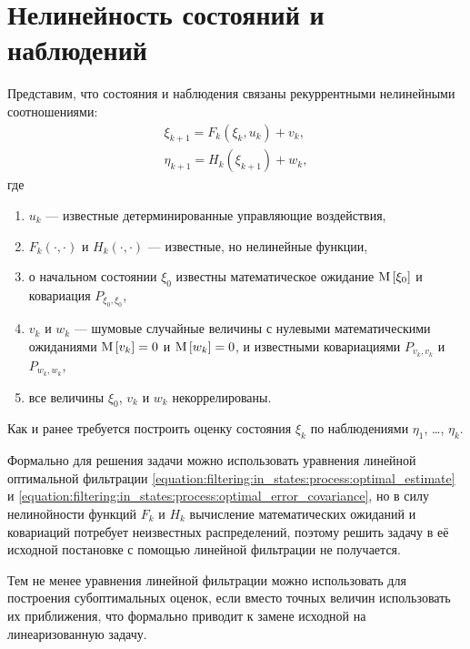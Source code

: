 \section{Нелинейность состояний и наблюдений}

Представим, что состояния и наблюдения связаны рекуррентными нелинейными соотношениями:
\begin{gather*}
    \xi_{k+1} = F_k ( \xi_k, u_k ) + v_k , \\
    \eta_{k+1} = H_k ( \xi_{k+1} ) + w_k,
\end{gather*}
где
\begin{enumerate}
    \item $u_k$ --- известные детерминированные управляющие воздействия,
    \item $F_k(\cdot, \cdot)$ и $H_k(\cdot, \cdot)$ --- известные, но нелинейные функции,
    \item о начальном состоянии $\xi_0$ известны математическое ожидание $\mathrm{M} \left [ \xi_0 \right ]$ и ковариация $P_{\xi_0, \xi_0}$,
    \item $v_k$ и $w_k$ --- шумовые случайные величины с нулевыми математическими ожиданиями $\mathrm{M} \left [ v_k \right ] = 0$ и $\mathrm{M} \left [ w_k \right ] = 0$, и известными
        ковариациями $P_{v_k, v_k}$ и $P_{w_k, w_k}$,
    \item все величины $\xi_0$, $v_k$ и $w_k$ некоррелированы.
\end{enumerate}

Как и ранее требуется построить оценку состояния $\xi_k$ по наблюдениями $\eta_1$, \dots, $\eta_k$.

Формально для решения задачи можно использовать уравнения линейной оптимальной фильтрации \eqref{equation:filtering:in_states:process:optimal_estimate} и
\eqref{equation:filtering:in_states:process:optimal_error_covariance}, но в силу нелинойности функций $F_k$ и $H_k$ вычисление математических ожиданий и ковариаций
потребует неизвестных распределений, поэтому решить задачу в её исходной постановке с помощью линейной фильтрации не получается.

Тем не менее уравнения линейной фильтрации можно использовать для построения субоптимальных оценок, если вместо точных величин использовать их приближения,
что формально приводит к замене исходной на линеаризованную задачу.